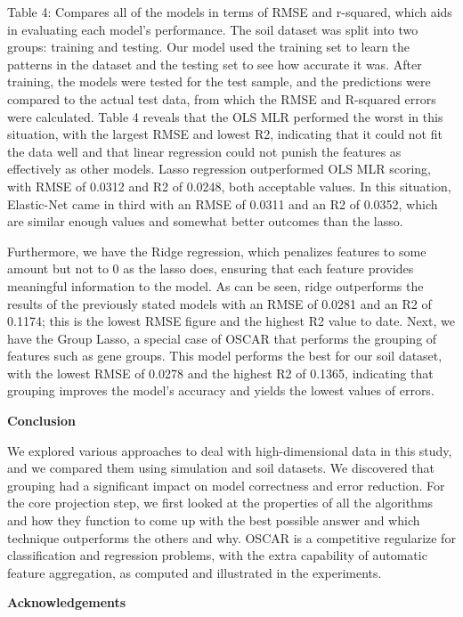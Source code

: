\documentclass{article} %
\begin{document}
\noindent Table 4: Compares all of the models in terms of RMSE and r-squared, which aids in evaluating each model's performance. The soil dataset was split into two groups: training and testing. Our model used the training set to learn the patterns in the dataset and the testing set to see how accurate it was. After training, the models were tested for the test sample, and the predictions were compared to the actual test data, from which the RMSE and R-squared errors were calculated. Table 4 reveals that the OLS MLR performed the worst in this situation, with the largest RMSE and lowest R2, indicating that it could not fit the data well and that linear regression could not punish the features as effectively as other models. Lasso regression outperformed OLS MLR scoring, with RMSE of 0.0312 and R2 of 0.0248, both acceptable values. In this situation, Elastic-Net came in third with an RMSE of 0.0311 and an R2 of 0.0352, which are similar enough values and somewhat better outcomes than the lasso.

\noindent Furthermore, we have the Ridge regression, which penalizes features to some amount but not to 0 as the lasso does, ensuring that each feature provides meaningful information to the model. As can be seen, ridge outperforms the results of the previously stated models with an RMSE of 0.0281 and an R2 of 0.1174; this is the lowest RMSE figure and the highest R2 value to date. Next, we have the Group Lasso, a special case of OSCAR that performs the grouping of features such as gene groups. This model performs the best for our soil dataset, with the lowest RMSE of 0.0278 and the highest R2 of 0.1365, indicating that grouping improves the model's accuracy and yields the lowest values of errors.

\noindent \textbf{Conclusion}

\noindent We explored various approaches to deal with high-dimensional data in this study, and we compared them using simulation and soil datasets. We discovered that grouping had a significant impact on model correctness and error reduction. For the core projection step, we first looked at the properties of all the algorithms and how they function to come up with the best possible answer and which technique outperforms the others and why. OSCAR is a competitive regularize for classification and regression problems, with the extra capability of automatic feature aggregation, as computed and illustrated in the experiments.

\noindent \textbf{Acknowledgements}
\end{document}
